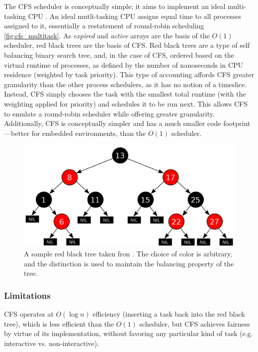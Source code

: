 \documentclass{sig-alternate-10pt}
\begin{document}
The CFS scheduler is conceptually simple; it aims to implement an ideal
multi-tasking CPU \cite{cfsdesign}. An ideal mutli-tasking CPU assigns equal
time to all processes assigned to it, essentially a restatement of
round-robin scheduling \ref{fig:cfs_multitask}. As \emph{expired} and
\emph{active} arrays are the basis of the $ O(1) $ scheduler, red black
trees are the basis of CFS. Red black trees are a type of self balancing
binary search tree, and, in the case of CFS, ordered based on the virtual
runtime of processes, as defined by the number of nanoseconds in CPU
residence (weighted by task priority). This type of accounting affords CFS
greater granularity than the other process schedulers, as it has no notion
of a timeslice. Instead, CFS simply chooses the task with the smallest total
runtime (with the weighting applied for priority) and schedules it to be run
next. This allows CFS to emulate a round-robin scheduler while offering
greater granularity. Additionally, CFS is conceptually simpler and has
a much smaller code footprint---better for embedded environments, than the
$ O(1) $ scheduler.

\begin{figure}
	\begin{center}
		\includegraphics[width=0.9\linewidth]{fig/rbtree.png}
		\caption{
			A sample red black tree taken fron \protect\cite{wiki:rbtree}. The choice of color is arbitrary, and the distinction is used to maintain the balancing property of the tree.
		}
		\label{fig:rbtree}
	\end{center}
\end{figure}

\subsubsection{Limitations}
CFS operates at $ O\left(\log n\right) $ efficiency (inserting
a task back into the red black tree), which is less efficient than the
$ O(1) $ scheduler, but CFS achieves fairness by virtue of its
implementation, without favoring any particular kind of task (e.g.
interactive vs. non-interactive).
\end{document}
